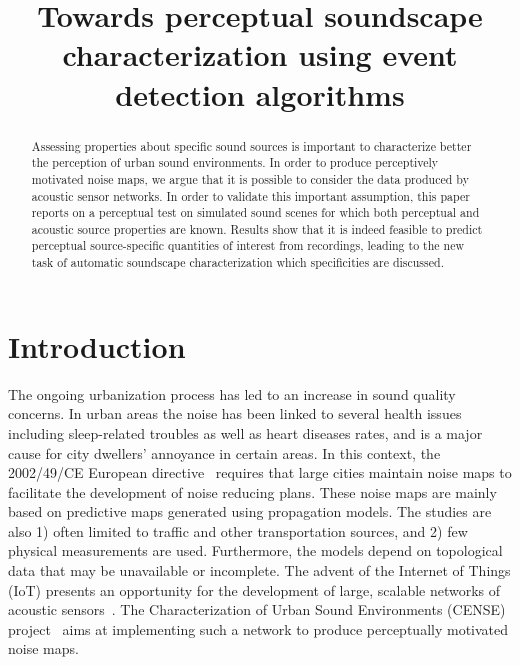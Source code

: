 \documentclass{article}
\title{Towards perceptual soundscape characterization using event detection algorithms}
\begin{document}
\ninept
\maketitle

\begin{sloppy}

\begin{abstract}
Assessing properties about specific sound sources is important to  characterize better the perception of urban sound environments. In order to produce perceptively motivated noise maps, we argue that it is possible to consider the data produced by acoustic sensor networks. In order to validate this important assumption, this paper reports on a perceptual test on simulated sound scenes for which both perceptual and acoustic source properties are known. Results show that it is indeed feasible to predict perceptual source-specific quantities of interest from recordings, leading to the new task of automatic soundscape characterization which specificities are discussed.

\end{abstract}

\begin{keywords}
\end{keywords}

\section{Introduction}
\label{sec:intro}

The ongoing urbanization process has led to an increase in sound quality concerns. In urban areas the noise has been linked to several health issues including sleep-related troubles as well as heart diseases rates, and is a major cause for city dwellers' annoyance in certain areas. In this context, the 2002/49/CE European directive~\cite{ec2002} requires that large cities maintain noise maps to facilitate the development of noise reducing plans. These noise maps are mainly based on predictive maps generated using propagation models. The studies are also 1) often limited to traffic and other transportation sources, and 2) few physical measurements are used. Furthermore, the models depend on topological data that may be unavailable or incomplete. The advent of the Internet of Things (IoT) presents an opportunity for the development of large, scalable networks of acoustic sensors~\cite{mydlarz2017, gontier2017}. The Characterization of Urban Sound Environments (CENSE) project~\cite{picault2017} aims at implementing such a network to produce perceptually motivated noise maps.


\end{sloppy}
\end{document}
